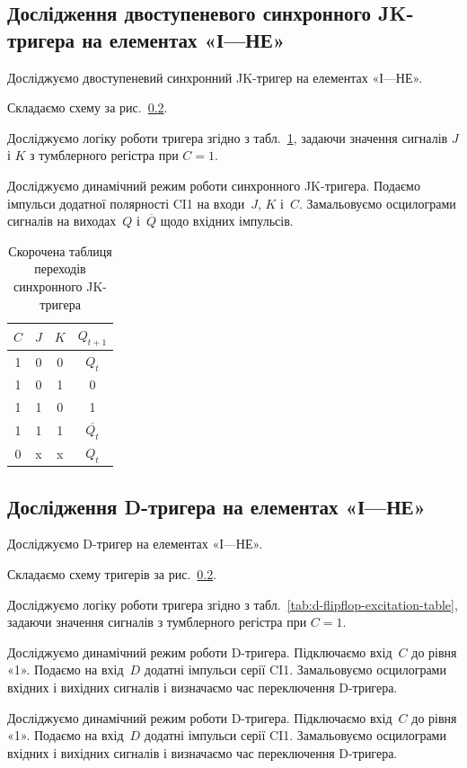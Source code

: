 \documentclass[a4paper,oneside,DIV=10,12pt]{scrartcl}
\newcommand\barneg[1]{\overline{#1}}
\begin{document}
		\subsection{Дослідження двоступеневого синхронного JK-тригера на елементах «І—НЕ»}
			Досліджуємо двоступеневий синхронний JK-тригер на елементах «І—НЕ».
			\begin{steps}
				\item Складаємо схему за рис.~\ref{}.
				
				\item Досліджуємо логіку роботи тригера згідно з табл.~\ref{tab:jk-flipflop-excitation-table}, задаючи значення сигналів $J$ і $K$ з тумблерного регістра при $C = 1$.
				
				\item Досліджуємо динамічний режим роботи синхронного JK-тригера. Подаємо імпульси додатної полярності CI1 на входи~$J$, $K$ і~$C$. Замальовуємо осцилограми сигналів на виходах~$Q$ і~$\barneg{Q}$ щодо вхідних імпульсів.
			\end{steps}
			
			\begin{table}[!htbp]
			\centering
					\begin{tabular}{cccc}
					\toprule
						$C$ & $J$ & $K$ & $Q_{t + 1}$\\
					\midrule
						1 & 0 & 0 & $Q_{t}$\\
						1 & 0 & 1 & 0\\
						1 & 1 & 0 & 1\\
						1 & 1 & 1 & $\barneg{Q_{t}}$\\
						0 & x & x & $Q_{t}$\\
					\bottomrule
				\end{tabular}
			\caption{Скорочена таблиця переходів синхронного JK-тригера}
			\label{tab:jk-flipflop-excitation-table}
			\end{table}
		
		\subsection{Дослідження D-тригера на елементах «І—НЕ»}
			Досліджуємо D-тригер на елементах «І—НЕ».
			\begin{steps}
				\item Складаємо схему тригерів за рис.~\ref{}.
				
				\item Досліджуємо логіку роботи тригера згідно з табл.~\ref{tab:d-flipflop-excitation-table}, задаючи значення сигналів з тумблерного регістра при $C = 1$.
				
				\item Досліджуємо динамічний режим роботи D-тригера. Підключаємо вхід~$C$ до рівня «1». Подаємо на вхід~$D$ додатні імпульси серії CI1. Замальовуємо осцилограми вхідних і вихідних сигналів і визначаємо час переключення D-тригера.
				\item Досліджуємо динамічний режим роботи D-тригера. Підключаємо вхід~$C$ до рівня «1». Подаємо на вхід~$D$ додатні імпульси серії CI1. Замальовуємо осцилограми вхідних і вихідних сигналів і визначаємо час переключення D-тригера.
			\end{steps}
			
\end{document}
